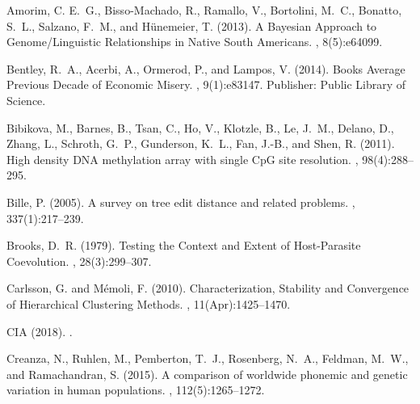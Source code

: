 \documentclass[a4]{article}
\newcommand{\+}[1]{\mathbf{#1}}
\begin{document}
% 

\begin{thebibliography}{}

Amorim, C. E.~G., {Bisso-Machado}, R., Ramallo, V., Bortolini, M.~C., Bonatto,
  S.~L., Salzano, F.~M., and H\"unemeier, T. (2013).
\newblock A {{Bayesian Approach}} to {{Genome}}/{{Linguistic Relationships}} in
  {{Native South Americans}}.
, 8(5):e64099.

Bentley, R.~A., Acerbi, A., Ormerod, P., and Lampos, V. (2014).
\newblock Books {Average} {Previous} {Decade} of {Economic} {Misery}.
, 9(1):e83147.
\newblock Publisher: Public Library of Science.

Bibikova, M., Barnes, B., Tsan, C., Ho, V., Klotzle, B., Le, J.~M., Delano, D.,
  Zhang, L., Schroth, G.~P., Gunderson, K.~L., Fan, J.-B., and Shen, R. (2011).
\newblock High density {DNA} methylation array with single {CpG} site
  resolution.
, 98(4):288--295.

Bille, P. (2005).
\newblock A survey on tree edit distance and related problems.
, 337(1):217--239.

Brooks, D.~R. (1979).
\newblock Testing the {{Context}} and {{Extent}} of {{Host}}-{{Parasite
  Coevolution}}.
, 28(3):299--307.

Carlsson, G. and M{\'e}moli, F. (2010).
\newblock Characterization, {{Stability}} and {{Convergence}} of {{Hierarchical
  Clustering Methods}}.
, 11(Apr):1425--1470.

CIA (2018).
.

Creanza, N., Ruhlen, M., Pemberton, T.~J., Rosenberg, N.~A., Feldman, M.~W.,
  and Ramachandran, S. (2015).
\newblock A comparison of worldwide phonemic and genetic variation in human
  populations.
,
  112(5):1265--1272.


\end{thebibliography}
\end{document}
